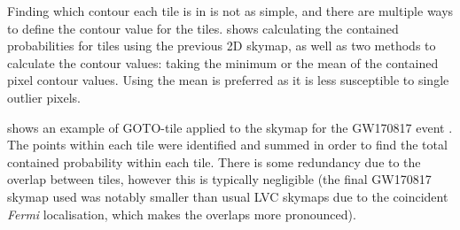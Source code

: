 \begin{colsection}
\begin{colsection}
Finding which contour each tile is in is not as simple, and there are multiple ways to define the contour value for the tiles.  shows calculating the contained probabilities for tiles using the previous 2D skymap, as well as two methods to calculate the contour values: taking the minimum or the mean of the contained pixel contour values. Using the mean is preferred as it is less susceptible to single outlier pixels.

 shows an example of GOTO-tile applied to the skymap for the GW170817 event \citep{GW170817}. The points within each tile were identified and summed in order to find the total contained probability within each tile. There is some redundancy due to the overlap between tiles, however this is typically negligible (the final GW170817 skymap used was notably smaller than usual LVC skymaps due to the coincident \textit{Fermi} localisation, which makes the overlaps more pronounced).


\end{colsection}
\end{colsection}
